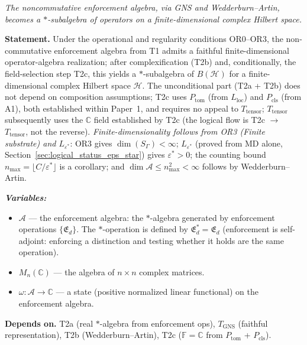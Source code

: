 \documentclass[11pt]{article}
\theoremstyle{remark}
\newenvironment{varlist}{\begin{itemize}[nosep,leftmargin=2em]}{\end{itemize}}
\begin{document}
\begin{tcolorbox}[apfbox, title={T2: Noncommutativity $\to$ Operator Algebra on Hilbert Space}]
\textit{The noncommutative enforcement algebra, via GNS and Wedderburn--Artin, becomes a $*$-subalgebra of operators on a finite-dimensional complex Hilbert space.}

\smallskip\noindent\textbf{Statement.}  Under the operational and regularity conditions OR0--OR3, the non-commutative enforcement algebra from T1 admits a faithful finite-dimensional operator-algebra realization; after complexification (T2b) and, conditionally, the field-selection step T2c, this yields a $*$-subalgebra of $B(\mathcal{H})$ for a finite-dimensional complex Hilbert space $\mathcal{H}$.  The unconditional part (T2a + T2b) does not depend on composition assumptions; T2c uses $P_{\mathrm{tom}}$ (from $L_{\mathrm{loc}}$) and $P_{\mathrm{cls}}$ (from A1), both established within Paper~1, and requires no appeal to $T_{\mathrm{tensor}}$; $T_{\mathrm{tensor}}$ subsequently uses the $\mathbb{C}$ field established by T2c (the logical flow is T2c $\to$ $T_{\mathrm{tensor}}$, not the reverse).  \emph{Finite-dimensionality follows from OR3 (Finite substrate) and $L_{\varepsilon^*}$}: OR3 gives $\dim(S_\Gamma) < \infty$; $L_{\varepsilon^*}$ (proved from MD alone, Section~\ref{sec:logical_status_eps_star}) gives $\varepsilon^* > 0$; the counting bound $n_{\max} = \lfloor C/\varepsilon^* \rfloor$ is a corollary; and $\dim \mathcal{A} \le n_{\max}^2 < \infty$ follows by Wedderburn--Artin.

\smallskip\noindent\textbf{\textit{Variables:}}
\begin{varlist}
\item $\mathcal{A}$ --- the enforcement algebra: the $*$-algebra generated by enforcement operations $\{\mathfrak{E}_d\}$.  The $*$-operation is defined by $\mathfrak{E}_d^* = \mathfrak{E}_d$ (enforcement is self-adjoint: enforcing a distinction and testing whether it holds are the same operation).
\item $M_n(\mathbb{C})$ --- the algebra of $n \times n$ complex matrices.
\item $\omega: \mathcal{A} \to \mathbb{C}$ --- a state (positive normalized linear functional) on the enforcement algebra.
\end{varlist}

\smallskip\noindent\textbf{Depends on.}  T2a (real $*$-algebra from enforcement ops), $T_{\mathrm{GNS}}$ (faithful representation), T2b (Wedderburn--Artin), T2c ($\mathbb{F} = \mathbb{C}$ from $P_{\mathrm{tom}}$ + $P_{\mathrm{cls}}$).


\end{tcolorbox}
\end{document}
